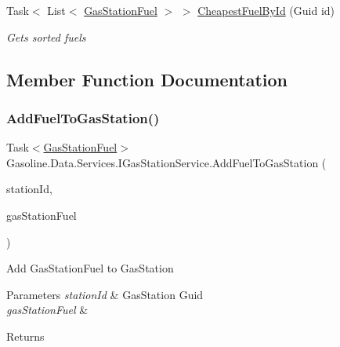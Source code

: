 \begin{DoxyCompactItemize}
Task$<$ List$<$ \mbox{\hyperlink{class_gasoline_1_1_data_1_1_models_1_1_gas_station_fuel}{Gas\+Station\+Fuel}} $>$ $>$ \mbox{\hyperlink{interface_gasoline_1_1_data_1_1_services_1_1_i_gas_station_service_ab8df09742ef4c7f1935743ca59b71824}{Cheapest\+Fuel\+By\+Id}} (Guid id)
\begin{DoxyCompactList}\small\item\em Gets sorted fuels \end{DoxyCompactList}\end{DoxyCompactItemize}


\subsection{Member Function Documentation}
\mbox{\label{interface_gasoline_1_1_data_1_1_services_1_1_i_gas_station_service_ac98dd15c284e623253f9fcec2cd2db97}} 
\subsubsection{\texorpdfstring{AddFuelToGasStation()}{AddFuelToGasStation()}}
{\footnotesize\ttfamily Task$<$\mbox{\hyperlink{class_gasoline_1_1_data_1_1_models_1_1_gas_station_fuel}{Gas\+Station\+Fuel}}$>$ Gasoline.\+Data.\+Services.\+I\+Gas\+Station\+Service.\+Add\+Fuel\+To\+Gas\+Station (\begin{DoxyParamCaption}\item[{Guid}]{station\+Id,  }\item[{\mbox{\hyperlink{class_gasoline_1_1_data_1_1_models_1_1_gas_station_fuel}{Gas\+Station\+Fuel}}}]{gas\+Station\+Fuel }\end{DoxyParamCaption})}



Add Gas\+Station\+Fuel to Gas\+Station 


\begin{DoxyParams}{Parameters}
{\em station\+Id} & Gas\+Station Guid\\
\hline
{\em gas\+Station\+Fuel} & \\
\hline
\end{DoxyParams}
\begin{DoxyReturn}{Returns}

\end{DoxyReturn}


